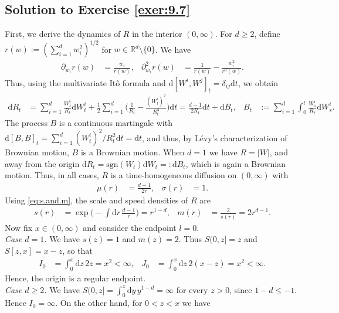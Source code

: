 \documentclass[12pt]{book}
\numberwithin{equation}{chapter}
\theoremstyle{plain}
\numberwithin{theorem}{section}
\theoremstyle{definition}
\numberwithin{exercise}{chapter}
\newcommand{\<}{\langle}
\renewcommand{\>}{\rangle}
\renewcommand{\(}{\left(}
\renewcommand{\)}{\right)}
\renewcommand{\[}{\left[}
\renewcommand{\]}{\right]}
\newcommand\Rb{\mathds{R}}
\newcommand\sig{\sigma}
\newcommand\del{\delta}
\renewcommand\d{\partial}
\newcommand\dd{\mathrm{d}}
\begin{document}
\subsection*{Solution to Exercise \ref{exer:9.7}}
First, we derive the dynamics of $R$ in the interior $(0,\infty)$.  For $d \geq 2$, define $r(w) := ( \sum_{i=1}^d w_i^2 )^{1/2}$ for $w \in \Rb^d \setminus \{0\}$.  We have
\begin{align}
\d_{w_i} r(w)
	&=	\frac{w_i}{r(w)} , &
\d_{w_i}^2 r(w)
	&=	\frac{1}{r(w)} - \frac{w_i^2}{r^3(w)} .
\end{align}
Thus, using the multivariate It\^o formula and $\dd [W^i,W^j]_t = \del_{ij} \dd t$, we obtain
\begin{align}
\dd R_t
	&=	\sum_{i=1}^d \frac{W_t^i}{R_t} \dd W_t^i + \frac{1}{2} \sum_{i=1}^d \Big( \frac{1}{R_t} - \frac{(W_t^i)^2}{R_t^3} \Big) \dd t
	=		\frac{d-1}{2 R_t} \dd t + \dd B_t , &
B_t
	&:=	\sum_{i=1}^d \int_0^t \frac{W_s^i}{R_s} \dd W_s^i .
\end{align}
The process $B$ is a continuous martingale with $\dd [B,B]_t = \sum_{i=1}^d (W_t^i)^2 / R_t^2 \dd t = \dd t$, and thus, by L\'evy's characterization of Brownian motion, $B$ is a Brownian motion.  When $d = 1$ we have $R = |W|$, and away from the origin $\dd R_t = \text{sgn}(W_t) \dd W_t =: \dd B_t$, which is again a Brownian motion.  Thus, in all cases, $R$ is a time-homogeneous diffusion on $(0,\infty)$ with
\begin{align}
\mu(r)
	&=	\frac{d-1}{2r} , &
\sig(r)
	&=	1 .
\end{align}
Using \eqref{eq:s.and.m}, the scale and speed densities of $R$ are
\begin{align}
s(r)
	&=	\exp \Big( - \int \dd r \, \frac{d-1}{r} \Big) = r^{1-d} , &
m(r)
	&=	\frac{2}{s(r)} = 2 r^{d-1} .
\end{align}
Now fix $x \in (0,\infty)$ and consider the endpoint $l = 0$.
\\[0.5em]
\textit{Case $d = 1$.}  We have $s(z) = 1$ and $m(z) = 2$.  Thus $S(0,z] = z$ and $S[z,x] = x - z$, so that
\begin{align}
I_0
	&=	\int_0^x \dd z \, 2 z
	=		x^2
	<		\infty , &
J_0
	&=	\int_0^x \dd z \, 2 (x - z)
	=		x^2
	<		\infty .
\end{align}
Hence, the origin is a regular endpoint.
\\[0.5em]
\textit{Case $d \geq 2$.}  We have $S(0,z] = \int_0^z \dd y \, y^{1-d} = \infty$ for every $z > 0$, since $1 - d \leq -1$.  Hence $I_0 = \infty$.  On the other hand, for $0 < z < x$ we have
\end{document}
